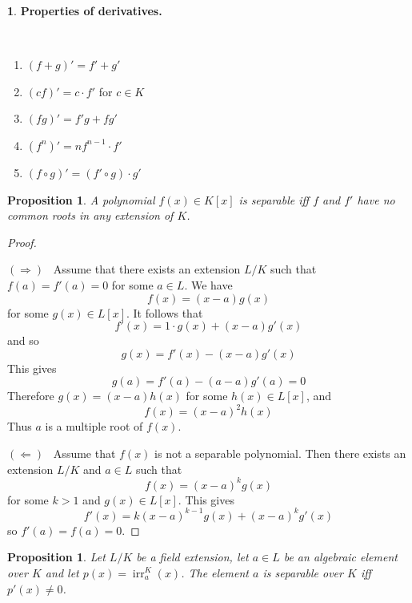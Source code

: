 \documentclass[12pt, letterpaper, oneside]{article}
\theoremstyle{plain}
\newtheorem{proposition}[theorem]{Proposition}
\theoremstyle{definition}
\newtheorem{nn}[theorem]{}
\newcommand{\irr}{\operatorname{irr}}
\newcommand{\benu}{\begin{enumerate}}
\newcommand{\eenu}{\end{enumerate}}
\newcommand{\vs}{\vskip 5mm}
\begin{document}
\vs\vs

\begin{nn}
\textbf{Properties of derivatives.}

\vskip -13mm

\ 
\benu
\item $(f+g)' = f' + g'$
\item $(cf)' = c\cdot f'$ for $c\in K$
\item $(fg)' = f'g + fg'$
\item $(f^{n})' = nf^{n-1}\cdot f'$
\item $(f\circ g)' = (f'\circ g)\cdot g'$
\eenu
\end{nn}


\vs\vs


\begin{proposition}
\label{PROP_DERSEPPOLY}
A polynomial $f(x)\in K[x]$ is separable iff $f$ and $f'$ have no common roots in any 
extension of $K$. 
\end{proposition}


\vs

\begin{proof} \ 

$(\Rightarrow)$ \  Assume that there exists an extension $L/K$ such that 
$f(a) = f'(a) = 0$ for some $a\in L$. We have 
$$f(x) = (x-a)g(x)$$
for some $g(x)\in L[x]$. It follows that 
$$f'(x) = 1\cdot g(x) + (x-a)g'(x)$$
and so 
$$g(x) = f'(x) - (x-a)g'(x)$$
This gives 
$$g(a) = f'(a) - (a-a)g'(a) = 0$$
Therefore $g(x) = (x-a)h(x)$ for some $h(x)\in L[x]$, and 
$$f(x) = (x-a)^{2}h(x)$$
Thus $a$ is a multiple root of $f(x)$.  

\vs

$(\Leftarrow)$ \ Assume that $f(x)$ is not a separable polynomial. Then
there exists an extension $L/K$ and $a\in L$ such that 
$$f(x) = (x-a)^{k}g(x)$$
for some $k> 1$ and $g(x)\in L[x]$. This gives 
$$f'(x) = k(x-a)^{k-1}g(x) + (x-a)^{k}g'(x)$$
so $f'(a) = f(a) = 0$.   

\end{proof}



\vs\vs



\begin{proposition}
\label{PROP_SEPELTZERODER}
Let $L/K$ be a field extension, let $a\in L$ be an algebraic element over $K$ and 
let $p(x) = \irr^{K}_{a}(x)$. The element  $a$ is separable over $K$ iff $p'(x) \neq  0$.  
\end{proposition}
\end{document}
